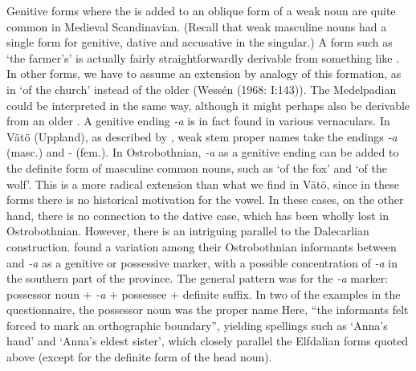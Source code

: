 {Genitive forms where the is added to an oblique form of a weak noun are quite common in Medieval Scandinavian. (Recall that weak masculine nouns had a single form for genitive, dative and accusative in the singular.) A form such as  ‘the farmer’s’ is actually fairly straightforwardly derivable from something like . In other forms, we have to assume an extension by analogy of this formation, as in  ‘of the church’ instead of the older  (Wessén (1968: I:143)). The Medelpadian  could be interpreted in the same way, although it might perhaps also be derivable from an older . A genitive ending\textit{ {}-a} is in fact found in various vernaculars. In Vätö (Uppland), as described by \citet{Schagerström1882}, weak stem proper names take the endings\textit{ {}-a} (masc.) and \nobreakdash- (fem.). In Ostrobothnian,\textit{ {}-a} as a genitive ending can be added to the definite form of masculine common nouns, such as  ‘of the fox’ and  ‘of the wolf’. This is a more radical extension than what we find in Vätö, since in these forms there is no historical motivation for the  vowel. In these cases, on the other hand, there is no connection to the dative case, which has been wholly lost in Ostrobothnian. However, there is an intriguing parallel to the Dalecarlian construction. \citet[43]{ErikssonEtAl1999} found a variation among their Ostrobothnian informants between and\textit{ {}-a} as a genitive or possessive marker, with a possible concentration of\textit{ {}-a} in the southern part of the province. The general pattern was for the\textit{ {}-a} marker: possessor noun +\textit{ {}-a} + possessee + definite suffix. In two of the examples in the questionnaire, the possessor noun was the proper name Here, “the informants felt forced to mark an orthographic boundary”, yielding spellings such as  ‘Anna’s hand’ and ‘Anna’s eldest sister’, which closely parallel the Elfdalian forms quoted above (except for the definite form of the head noun).

}
